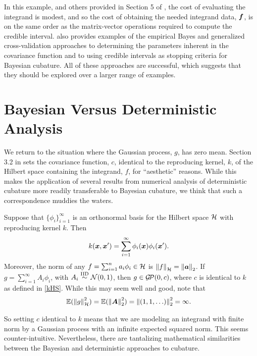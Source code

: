 \documentclass[sts]{imsart}
\numberwithin{equation}{section}
\theoremstyle{plain}
\newcommand{\calGP}{\cg\!\cp}
\newcommand{\BOGOS}{\citetalias{BriEtal18a}}%
\newcommand{\JH}{\citetalias{RatHic19a}}%
\begin{document}
In this example, and others provided in Section 5 of \JH{}, the cost of evaluating the integrand is modest, and so the cost of obtaining the needed integrand data, $\vf$, is on the same order as the matrix-vector operations required to compute the credible interval.  \JH{} also provides examples of the empirical Bayes and generalized cross-validation approaches to determining the parameters inherent in the covariance function and to using credible intervals as stopping criteria for Bayesian cubature.  All of these approaches are successful, which suggests that they should be explored over a larger range of examples.  

\section{Bayesian Versus Deterministic Analysis} \label{sec:ProbDet}

We return to the situation where the Gaussian process, $g$, has zero mean.  Section 3.2 in \BOGOS{} sets the covariance function, $c$, identical to the reproducing kernel, $k$, of the Hilbert space containing the integrand, $f$, for ``aesthetic'' reasons.  While this makes the application of several results from numerical analysis of deterministic cubature more readily transferable to Bayesian cubature, we think that such a correspondence muddies the waters.  

Suppose that $\{\phi_i\}_{i=1}^\infty$ is an orthonormal basis for the Hilbert space $\ch$ with reproducing kernel $k$.  Then 
\begin{equation}
    \label{kHS}
    k(\vx,\vx') = \sum_{i=1}^\infty \phi_i(\vx) \phi_i(\vx').
\end{equation}
Moreover, the norm of any $f = \sum_{i=1}^n a_i \phi_i \in \ch$ is $\norm[\ch]{f} = \norm[2]{\va}$.  If $g = \sum_{i=1}^\infty A_i \phi_i$, with $A_i \IIDsim \cn(0,1)$, then $g \in \calGP(0,c)$, where $c$ is identical to $k$ as defined in \eqref{kHS}.  While this may seem well and good, note that 
\[
\Ex(\norm[\ch]{g}^2) = \Ex(\norm[2]{\vA}^2) = \norm[2]{(1,1, \ldots) }^2 = \infty.
\]

So setting $c$ identical to $k$ means that we are modeling an integrand with finite norm by a Gaussian process with an infinite expected squared norm.
This seems counter-intuitive.  Nevertheless, there are tantalizing mathematical similarities between the Bayesian and deterministic approaches to cubature.
\end{document}

